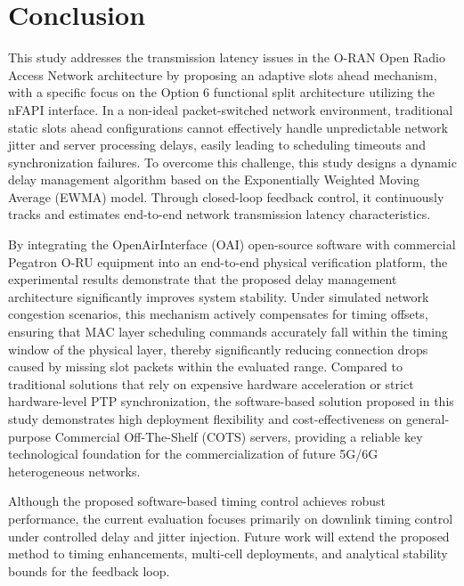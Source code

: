 \documentclass[../my_ntust_thesis.tex]{subfiles}
\begin{document}

\chapter{Conclusion}
\label{sec:conclusions}

This study addresses the transmission latency issues in the O-RAN Open Radio Access Network architecture by proposing an adaptive slots ahead mechanism, with a specific focus on the Option 6 functional split architecture utilizing the nFAPI interface. In a non-ideal packet-switched network environment, traditional static slots ahead configurations cannot effectively handle unpredictable network jitter and server processing delays, easily leading to scheduling timeouts and synchronization failures. To overcome this challenge, this study designs a dynamic delay management algorithm based on the Exponentially Weighted Moving Average (EWMA) model. Through closed-loop feedback control, it continuously tracks and estimates end-to-end network transmission latency characteristics.

By integrating the OpenAirInterface (OAI) open-source software with commercial Pegatron O-RU equipment into an end-to-end physical verification platform, the experimental results demonstrate that the proposed delay management architecture significantly improves system stability. Under simulated network congestion scenarios, this mechanism actively compensates for timing offsets, ensuring that MAC layer scheduling commands accurately fall within the timing window of the physical layer, thereby significantly reducing connection drops caused by missing slot packets within the evaluated range. Compared to traditional solutions that rely on expensive hardware acceleration or strict hardware-level PTP synchronization, the software-based solution proposed in this study demonstrates high deployment flexibility and cost-effectiveness on general-purpose Commercial Off-The-Shelf (COTS) servers, providing a reliable key technological foundation for the commercialization of future 5G/6G heterogeneous networks.

Although the proposed software-based timing control achieves robust performance, the current evaluation focuses primarily on downlink timing control under controlled delay and jitter injection. Future work will extend the proposed method to timing enhancements, multi-cell deployments, and analytical stability bounds for the feedback loop.
\end{document}
